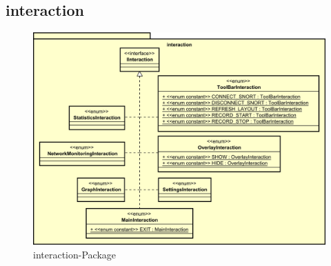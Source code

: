 \subsection{interaction}
\label{subsec:interaction}

\begin{figure}[H]
  \centering
  \includegraphics[width=\textwidth]{../diagramimages/interaction.png}
  \caption{interaction-Package}
\end{figure}
